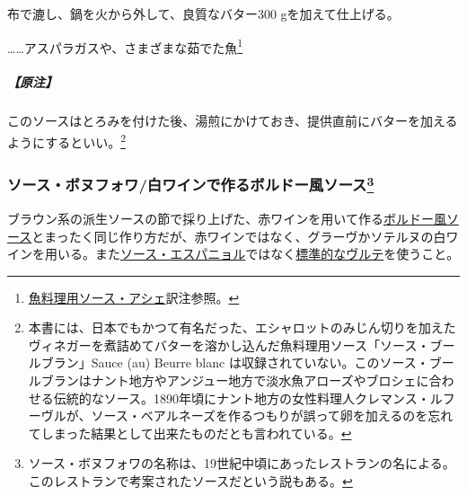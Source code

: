 \begin{recette}
布で漉し、鍋を火から外して、良質なバター300 gを加えて仕上げる。

\ldots{}\ldots{}アスパラガスや、さまざまな茹でた魚\footnote{\protect\hyperlink{sauce-hachee-maigre}{魚料理用ソース・アシェ}訳注参照。}

\hypertarget{nota-sauce-au-beurre}{%
\subparagraph{【原注】}\label{nota-sauce-au-beurre}}

このソースはとろみを付けた後、湯煎にかけておき、提供直前にバターを加えるようにするといい。\footnote{本書には、日本でもかつて有名だった、エシャロットのみじん切りを加えたヴィネガーを煮詰めてバターを溶かし込んだ魚料理用ソース「ソース・ブールブラン」Sauce
  (au) Beurre blanc
  は収録されていない。このソース・ブールブランはナント地方やアンジュー地方で淡水魚アローズやブロシェに合わせる伝統的なソース。1890年頃にナント地方の女性料理人クレマンス・ルフーヴルが、ソース・ベアルネーズを作るつもりが誤って卵を加えるのを忘れてしまった結果として出来たものだとも言われている。}

\hypertarget{sauce-bonnefoy}{%
\subsubsection[ソース・ボヌフォワ/白ワインで作るボルドー風ソース]{\texorpdfstring{ソース・ボヌフォワ/白ワインで作るボルドー風ソース\footnote{ソース・ボヌフォワの名称は、19世紀中頃にあったレストランの名による。このレストランで考案されたソースだという説もある。}}{ソース・ボヌフォワ/白ワインで作るボルドー風ソース}}\label{sauce-bonnefoy}}



ブラウン系の派生ソースの節で採り上げた、赤ワインを用いて作る\protect\hyperlink{sauce-bordelaise}{ボルドー風ソース}とまったく同じ作り方だが、赤ワインではなく、グラーヴかソテルヌの白ワインを用いる。また\protect\hyperlink{sauce-espagnole}{ソース・エスパニョル}ではなく\protect\hyperlink{veloute}{標準的なヴルテ}を使うこと。


\end{recette}
